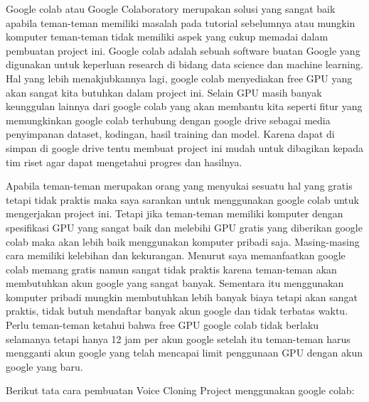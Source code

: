 Google colab atau Google Colaboratory merupakan solusi yang sangat baik apabila teman-teman memiliki masalah pada tutorial sebelumnya atau mungkin komputer teman-teman tidak memiliki aspek yang cukup memadai dalam pembuatan project ini. Google colab adalah sebuah software buatan Google yang digunakan untuk keperluan research di bidang data science dan machine learning. Hal yang lebih menakjubkannya lagi, google colab menyediakan free GPU yang akan sangat kita butuhkan dalam project ini. Selain GPU masih banyak keunggulan lainnya dari google colab yang akan membantu kita seperti fitur yang memungkinkan google colab terhubung dengan google drive sebagai media penyimpanan dataset, kodingan, hasil training dan model. Karena dapat di simpan di google drive tentu membuat project ini mudah untuk dibagikan kepada tim riset agar dapat mengetahui progres dan hasilnya.

Apabila teman-teman merupakan orang yang menyukai sesuatu hal yang gratis tetapi tidak praktis maka saya sarankan untuk menggunakan google colab untuk mengerjakan project ini. Tetapi jika teman-teman memiliki komputer dengan spesifikasi GPU yang sangat baik dan melebihi GPU gratis yang diberikan google colab maka akan lebih baik menggunakan komputer pribadi saja. Masing-masing cara memiliki kelebihan dan kekurangan. Menurut saya memanfaatkan google colab memang gratis namun sangat tidak praktis karena teman-teman akan membutuhkan akun google yang sangat banyak. Sementara itu menggunakan komputer pribadi mungkin membutuhkan lebih banyak biaya tetapi akan sangat praktis, tidak butuh mendaftar banyak akun google dan tidak terbatas waktu. Perlu teman-teman ketahui bahwa free GPU google colab tidak berlaku selamanya tetapi hanya 12 jam per akun google setelah itu teman-teman harus mengganti akun google yang telah mencapai limit penggunaan GPU dengan akun google yang baru.

Berikut tata cara pembuatan Voice Cloning Project menggunakan google colab:

